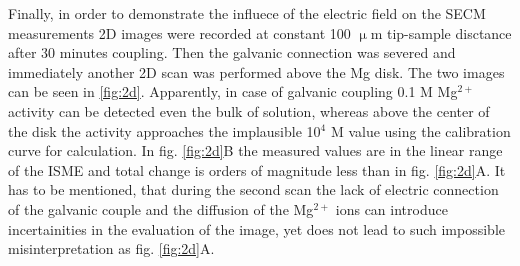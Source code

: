 \documentclass[3p]{elsarticle}
\begin{document}
Finally, in order to demonstrate the influece of the electric field on the SECM measurements 2D images were recorded at constant 100 $\upmu$m tip-sample disctance after 30 minutes coupling. 
Then the galvanic connection was severed and immediately another 2D scan was performed above the Mg disk. The two images can be seen in \ref{fig:2d}. Apparently, in case of galvanic coupling 0.1 M Mg$^{2+}$ activity can be detected even the bulk of solution, whereas above the center of the disk the activity approaches the implausible 10$^{4}$ M value using the calibration curve for calculation.   
In fig. \ref{fig:2d}B the measured values are in the linear range of the ISME and total change is orders of magnitude less than in fig. \ref{fig:2d}A. It has to be mentioned, that during the second scan the lack of electric connection of the galvanic couple and the diffusion of the Mg$^{2+}$ ions can introduce incertainities in the evaluation of the image, yet does not lead to such impossible misinterpretation as fig. \ref{fig:2d}A.
\end{document}
